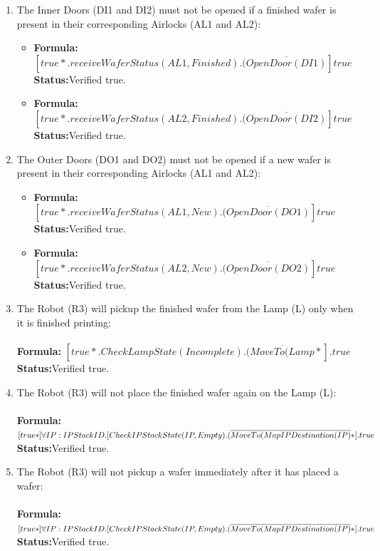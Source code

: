 \documentclass[a4paper,12pt]{article}
\begin{document}
\begin{enumerate}
		
		\item The Inner Doors (DI1 and DI2) must not be opened if a finished wafer is present in their corresponding Airlocks (AL1 and AL2):
		\begin{itemize}
			\item \textbf{Formula:} $[true*.receiveWaferStatus(AL1,Finished).(\overline{OpenDoor(DI1)}]true$ 
			\\\textbf{Status:}Verified true.
			\item \textbf{Formula:} $[true*.receiveWaferStatus(AL2,Finished).(\overline{OpenDoor(DI2)}]true$  
			\\\textbf{Status:}Verified true.
		\end{itemize}
		
		
		\item The Outer Doors (DO1 and DO2) must not be opened if a new wafer is present in their corresponding Airlocks (AL1 and AL2):
		\begin{itemize}
			\item \textbf{Formula:} $[true*.receiveWaferStatus(AL1,New).(\overline{OpenDoor(DO1)}]true$ 
			\\\textbf{Status:}Verified true.
			\item \textbf{Formula:} $[true*.receiveWaferStatus(AL2,New).(\overline{OpenDoor(DO2)}]true$  
			\\\textbf{Status:}Verified true.
		\end{itemize}
		
		
		\item The Robot (R3) will pickup the finished wafer from the Lamp (L) only when it is finished printing:
		\\
		\\\textbf{Formula:} $[true*.CheckLampState(Incomplete).(\overline{MoveTo(Lamp}*].true$ \\\textbf{Status:}Verified true.
		
		\item The Robot (R3) will not place the finished wafer again on the Lamp (L):
		\\
		\\\textbf{Formula:} $[true*] \forall IP: IPStackID.[CheckIPStackState(IP, Empty).
		\\(\overline{MoveTo(MapIPDestination(IP)}*].true$ \\\textbf{Status:}Verified true.
		
		\item The Robot (R3) will not pickup a wafer immediately after it has placed a wafer:
		\\
		\\\textbf{Formula:} $[true*] \forall IP: IPStackID.[CheckIPStackState(IP, Empty).
		\\(\overline{MoveTo(MapIPDestination(IP)}*].true$ \\\textbf{Status:}Verified true.
		

\end{enumerate}
\end{document}
